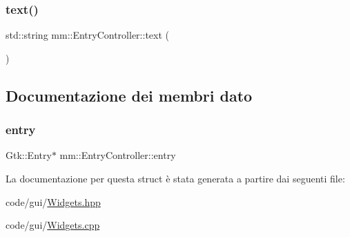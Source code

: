 \mbox{\label{structmm_1_1_entry_controller_a8665e8b7d74b0f8c807d5b3ad418e535}} 
\subsubsection{\texorpdfstring{text()}{text()}}
{\footnotesize\ttfamily std\+::string mm\+::\+Entry\+Controller\+::text (\begin{DoxyParamCaption}{ }\end{DoxyParamCaption})\hspace{0.3cm}{\ttfamily [inline]}}



\subsection{Documentazione dei membri dato}
\mbox{\label{structmm_1_1_entry_controller_ab41f377d1a98b2bf967c81dc1dc7f391}} 
\subsubsection{\texorpdfstring{entry}{entry}}
{\footnotesize\ttfamily Gtk\+::\+Entry$\ast$ mm\+::\+Entry\+Controller\+::entry}



La documentazione per questa struct è stata generata a partire dai seguenti file\+:\begin{DoxyCompactItemize}
\item 
code/gui/\mbox{\hyperlink{_widgets_8hpp}{Widgets.\+hpp}}\item 
code/gui/\mbox{\hyperlink{_widgets_8cpp}{Widgets.\+cpp}}\end{DoxyCompactItemize}
